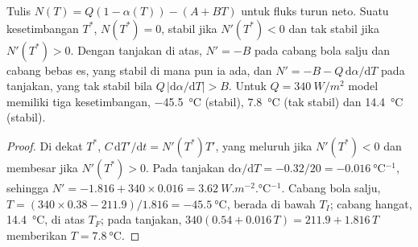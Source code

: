 \begin{proposition}\label{prop:b3:climate-models:three}
Tulis $N(T) = Q(1 - \alpha(T)) - (A + BT)$ untuk fluks turun neto. Suatu
kesetimbangan $T^*$, $N(T^*) = 0$, stabil jika $N'(T^*) < 0$ dan tak stabil jika
$N'(T^*) > 0$. Dengan tanjakan di atas, $N' = -B$ pada cabang bola salju dan
cabang bebas es, yang stabil di mana pun ia ada, dan $N' = -B -
Q\,\mathrm d\alpha/\mathrm dT$ pada tanjakan, yang tak stabil bila $Q\,
|\mathrm d\alpha/\mathrm dT| > B$. Untuk $Q = \qty{340}{W/m^2}$ model memiliki
tiga kesetimbangan, \qty{-45.5}{\celsius} (stabil), \qty{7.8}{\celsius}
(tak stabil) dan \qty{14.4}{\celsius} (stabil).
\end{proposition}

\begin{proof}
Di dekat $T^*$, $C\,\mathrm dT'/\mathrm dt = N'(T^*)T'$, yang meluruh jika
$N'(T^*) < 0$ dan membesar jika $N'(T^*) > 0$. Pada tanjakan $\mathrm d\alpha/
\mathrm dT = -0.32/20 = \qty{-0.016}{\celsius^{-1}}$, sehingga $N' = -1.816 + 340
\times 0.016 = \qty{+3.62}{W.m^{-2}.\celsius^{-1}}$. Cabang bola salju,
$T = (340\times0.38 - 211.9)/1.816 = \qty{-45.5}{\celsius}$, berada di bawah
$T_I$; cabang hangat, \qty{14.4}{\celsius}, di atas $T_F$; pada tanjakan,
$340(0.54 + 0.016\,T) = 211.9 + 1.816\,T$ memberikan $T = \qty{7.8}{\celsius}$.
\end{proof}


